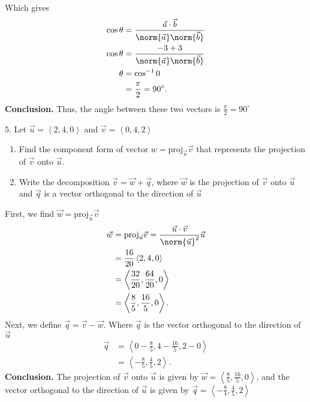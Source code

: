 \documentclass{report}
\begin{document}
    Which gives
    \begin{align*}
        \cos{\theta} &= \frac{\vec{a} \cdot \vec{b}}{\norm{\vec{a}}\norm{\vec{b}}} \\
                     \cos{\theta } &= \frac{-3 + 3}{\norm{\vec{a}}\norm{\vec{b}}} \\
                     \theta &= \cos^{-1}{0} \\
                            &=\frac{\pi}{2} = 90^{\circ}
    .\end{align*}
    \textbf{Conclusion.} Thus, the angle between these two vectors is $\frac{\pi}{2} = 90^{\circ}$
    \bigbreak \noindent 
    \begin{mdframed}
        5. Let $\vec{u} = \left\langle 2,4,0 \right\rangle $ and $\vec{v}  = \left\langle 0,4,2 \right\rangle$
        \begin{enumerate}[label=(\alph*)]
            \item Find the component form of vector $w=\text{proj}_{\vec{u}}\vec{v}$ that represents the projection of $\vec{v}$ onto $\vec{u}$.
            \item Write the decomposition $\vec{v} = \vec{w} + \vec{q}$, where $\vec{w}$ is the projection of $\vec{v}$ onto $\vec{u}$ and $\vec{q}$ is a vector orthogonal to the direction of $\vec{u}$
        \end{enumerate}
    \end{mdframed}
    \bigbreak \noindent 
    First, we find $\vec{w} = \text{proj}_{\vec{u}}\vec{v} $
    \begin{align*}
        \vec{w} &= \text{proj}_{\vec{u}} \vec{v} = \frac{\vec{u} \cdot \vec{v}}{\norm{\vec{u}}^{2}}\vec{u} \\
        &=\frac{16}{20}\left\langle 2,4,0 \right\rangle \\
        &=\left\langle \frac{32}{20}, \frac{64}{20}, 0 \right\rangle \\
        &= \left\langle \frac{8}{5}, \frac{16}{5},0 \right\rangle
    .\end{align*}
    \bigbreak \noindent 
    Next, we define $\vec{q} = \vec{v} - \vec{w}$. Where $\vec{q}$ is the vector orthogonal to the direction of $\vec{u}$
    \begin{align*}
        \vec{q} &= \left\langle 0-\frac{8}{5}, 4-\frac{16}{5}, 2-0 \right\rangle \\
        &=\left\langle -\frac{8}{5}, \frac{4}{5}, 2 \right\rangle
    .\end{align*}
    \bigbreak \noindent 
    \textbf{Conclusion.} The projection of $\vec{v}$ onto $\vec{u}$ is given by $\vec{w} = \left\langle \frac{8}{5}, \frac{16}{5}, 0\right\rangle $, and the vector orthogonal to the direction of $\vec{u}$ is given by $\vec{q} = \left\langle -\frac{8}{4}, \frac{4}{5}, 2 \right\rangle $
\end{document}
